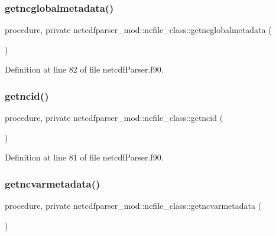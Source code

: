 \subsubsection{\texorpdfstring{getncglobalmetadata()}{getncglobalmetadata()}}
{\footnotesize\ttfamily procedure, private netcdfparser\+\_\+mod\+::ncfile\+\_\+class\+::getncglobalmetadata (\begin{DoxyParamCaption}{ }\end{DoxyParamCaption})\hspace{0.3cm}{\ttfamily [private]}}



Definition at line 82 of file netcdf\+Parser.\+f90.

\mbox{\label{structnetcdfparser__mod_1_1ncfile__class_a78eb48e6493c1f48f44b89517addf2bc}} 
\subsubsection{\texorpdfstring{getncid()}{getncid()}}
{\footnotesize\ttfamily procedure, private netcdfparser\+\_\+mod\+::ncfile\+\_\+class\+::getncid (\begin{DoxyParamCaption}{ }\end{DoxyParamCaption})\hspace{0.3cm}{\ttfamily [private]}}



Definition at line 81 of file netcdf\+Parser.\+f90.

\mbox{\label{structnetcdfparser__mod_1_1ncfile__class_a87e2ab9be12dd33782a39be6103c05b4}} 
\subsubsection{\texorpdfstring{getncvarmetadata()}{getncvarmetadata()}}
{\footnotesize\ttfamily procedure, private netcdfparser\+\_\+mod\+::ncfile\+\_\+class\+::getncvarmetadata (\begin{DoxyParamCaption}{ }\end{DoxyParamCaption})\hspace{0.3cm}{\ttfamily [private]}}



